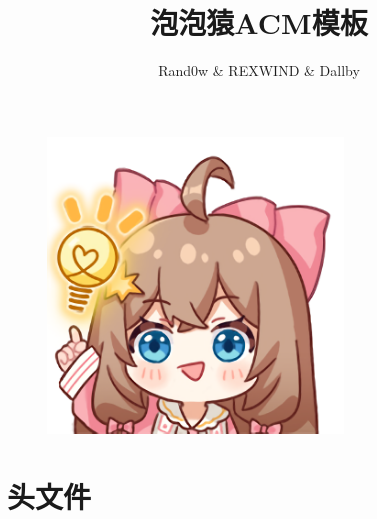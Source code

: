 \documentclass[a4]{ctexart}
\title{\CJKfamily{hei} \bfseries 泡泡猿ACM模板}
\author{Rand0w \& REXWIND \& Dallby}
\begin{document}
\small
\begin{titlepage}
\maketitle
\begin{figure}[H] %
\centering %
\includegraphics[width=0.7\textwidth]{1.png } %
\end{figure}
\end{titlepage}

\newpage
\pagestyle{empty}
\renewcommand{\contentsname}{目录}
\tableofcontents
\newpage\clearpage
\newpage
\pagestyle{fancy}
\setcounter{page}{1}   %

\section{头文件}
\end{document}
